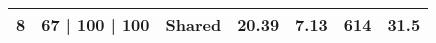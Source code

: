 \begin{table}[h!]
{\begin{tabular}{|l|l|l|l|l|l|l|}
8                      & 67 | 100 | 100                                                                                  & Shared                             & 20.39                                                                                          & 7.13                                                                                                   & 614                                                                                                                                               & 31.5                                                                           \\ \hline
\end{tabular}%
}
\end{table}

